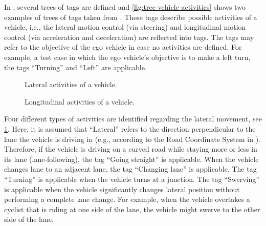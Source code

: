 In \cite{degelder2019scenarioclasses}, several trees of tags are defined and \cref{fig:tree vehicle activities} shows two examples of trees of tags taken from \cite{degelder2019scenarioclasses}. These tags describe possible activities of a vehicle, i.e., the lateral motion control (via steering) and longitudinal motion control (via acceleration and deceleration) are reflected into tags. The tags may refer to the objective of the ego vehicle in case no activities are defined. For example, a test case in which the ego vehicle's objective is to make a left turn, the tags ``Turning'' and ``Left'' are applicable. 

\cbend
\begin{figure*}
	\centering
	\begin{subfigure}{\linewidth}
		\centering
		\caption{Lateral activities of a vehicle.}
		\label{fig:tree vehicle lat act}
	\end{subfigure}
	\begin{subfigure}{\linewidth}
		\centering
		\caption{Longitudinal activities of a vehicle.}
		\label{fig:tree vehicle long act}
	\end{subfigure}
	\caption{Tags for lateral and longitudinal activities of a vehicle. The lateral activity is relative to the lane in which the corresponding vehicle is driving. For example, if the vehicle is driving on a curved road, its lateral activity is ``Going straight''. Figure is taken from \cite{degelder2019scenarioclasses}.}
	\label{fig:tree vehicle activities}
\end{figure*}
\cbstart

Four different types of activities are identified regarding the lateral movement, see \cref{fig:tree vehicle lat act}. Here, it is assumed that ``Lateral'' refers to the direction perpendicular to the lane the vehicle is driving in (e.g., according to the Road Coordinate System in \cite{zofka2015datadrivetrafficscenarios}). Therefore, if the vehicle is driving on a curved road while staying more or less in its lane (lane-following), the tag ``Going straight'' is applicable. When the vehicle changes lane to an adjacent lane, the tag ``Changing lane'' is applicable. The tag ``Turning'' is applicable when the vehicle turns at a junction. The tag ``Swerving'' is applicable when the vehicle significantly changes lateral position without performing a complete lane change. For example, when the vehicle overtakes a cyclist that is riding at one side of the lane, the vehicle might swerve to the other side of the lane.

\cbend
